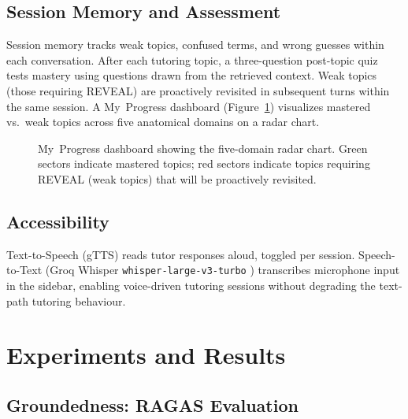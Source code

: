 \documentclass[11pt]{article}
\begin{document}
\subsection{Session Memory and Assessment}

Session memory tracks weak topics, confused terms, and wrong guesses
within each conversation.
After each tutoring topic, a three-question post-topic quiz tests mastery
using questions drawn from the retrieved context.
Weak topics (those requiring REVEAL) are proactively revisited in subsequent
turns within the same session.
A My~Progress dashboard (Figure~\ref{fig:dashboard}) visualizes mastered
vs.\ weak topics across five anatomical domains on a radar chart.

\begin{figure}[t]
  \centering
  \caption{My~Progress dashboard showing the five-domain radar chart.
  Green sectors indicate mastered topics; red sectors indicate topics
  requiring REVEAL (weak topics) that will be proactively revisited.}
  \label{fig:dashboard}
\end{figure}

\subsection{Accessibility}

Text-to-Speech (gTTS) reads tutor responses aloud, toggled per session.
Speech-to-Text (Groq Whisper \texttt{whisper-large-v3-turbo} \citep{whisper})
transcribes microphone input in the sidebar, enabling voice-driven
tutoring sessions without degrading the text-path tutoring behaviour.

\section{Experiments and Results}

\subsection{Groundedness: RAGAS Evaluation}
\label{sec:ragas}
\end{document}
